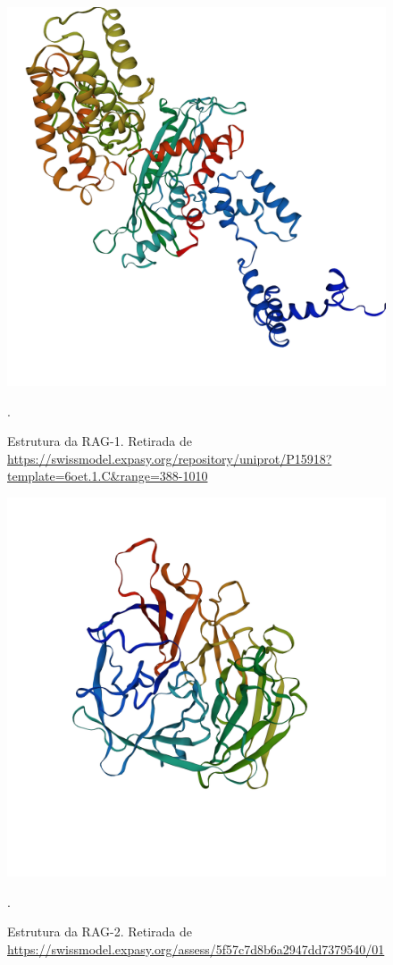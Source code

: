 \documentclass[
	12pt,				%
	openright,			%
	twoside,			%
	a4paper,			%
	]{abntex2}
\begin{document}


	
	\begin{figure}
		\centering
		\includegraphics[width=0.5\linewidth]{RAG1stru}
		\caption[Estrutura da RAG-1.]{Estrutura da RAG-1. Retirada de \url{https://swissmodel.expasy.org/repository/uniprot/P15918?template=6oet.1.C&range=388-1010}}.
		\label{fig:rag1stru}
	\end{figure}

	
	\begin{figure}
		\centering
		\includegraphics[width=0.5\linewidth]{RAG2stru}
		\caption[Estrutura da RAG-2.]{Estrutura da RAG-2. Retirada de \url{https://swissmodel.expasy.org/assess/5f57c7d8b6a2947dd7379540/01}}.
		\label{fig:rag2stru}
	\end{figure}
\end{document}
